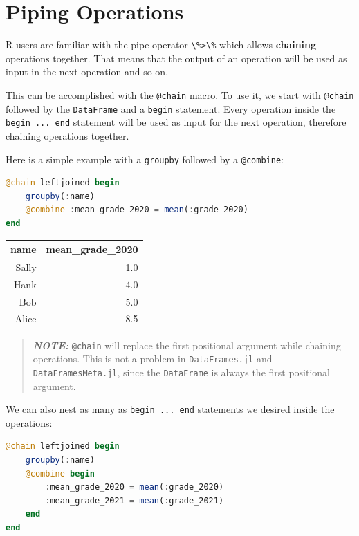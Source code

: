\documentclass[
  notoc %
]{tufte-book}
\newcommand{\passthrough}[1]{#1}
\begin{document}
\hypertarget{sec:dataframesmeta_chain}{%
\section{Piping Operations}\label{sec:dataframesmeta_chain}}

R users are familiar with the pipe operator
\passthrough{\lstinline!\%>\%!} which allows \textbf{chaining}
operations together. That means that the output of an operation will be
used as input in the next operation and so on.

This can be accomplished with the \passthrough{\lstinline!@chain!}
macro. To use it, we start with \passthrough{\lstinline!@chain!}
followed by the \passthrough{\lstinline!DataFrame!} and a
\passthrough{\lstinline!begin!} statement. Every operation inside the
\passthrough{\lstinline!begin ... end!} statement will be used as input
for the next operation, therefore chaining operations together.

Here is a simple example with a \passthrough{\lstinline!groupby!}
followed by a \passthrough{\lstinline!@combine!}:

\begin{lstlisting}[language=Julia]
@chain leftjoined begin
    groupby(:name)
    @combine :mean_grade_2020 = mean(:grade_2020)
end
\end{lstlisting}

\begin{longtable}[]{@{}rr@{}}
\toprule
name & mean\_grade\_2020 \\
\midrule
\endhead
Sally & 1.0 \\
Hank & 4.0 \\
Bob & 5.0 \\
Alice & 8.5 \\
\bottomrule
\end{longtable}

\begin{quote}
\textbf{\emph{NOTE:}} \passthrough{\lstinline!@chain!} will replace the
first positional argument while chaining operations. This is not a
problem in \passthrough{\lstinline!DataFrames.jl!} and
\passthrough{\lstinline!DataFramesMeta.jl!}, since the
\passthrough{\lstinline!DataFrame!} is always the first positional
argument.
\end{quote}

We can also nest as many as \passthrough{\lstinline!begin ... end!}
statements we desired inside the operations:

\begin{lstlisting}[language=Julia]
@chain leftjoined begin
    groupby(:name)
    @combine begin
        :mean_grade_2020 = mean(:grade_2020)
        :mean_grade_2021 = mean(:grade_2021)
    end
end
\end{lstlisting}
\end{document}
